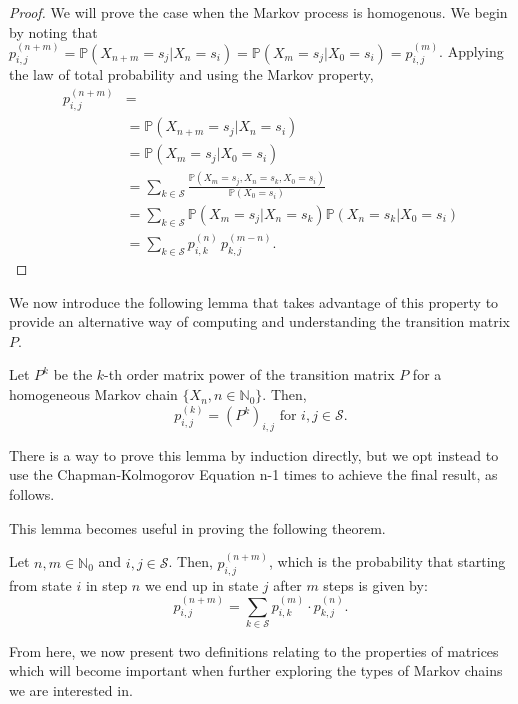 \begin{proof}
	We will prove the case when the Markov process is homogenous. We begin by noting that $p_{i,j}^{(n+m)} = \mathbb{P}(X_{n+m} = s_j | X_n = s_i) = \mathbb{P}(X_m = s_j | X_0 = s_i) = p_{i,j}^{(m)}$. Applying the law of total probability and using the Markov property, 
	\begin{align*} 
		p_{i,j}^{(n+m)} &= \\ 
		&= \mathbb{P}(X_{n+m} = s_j | X_n = s_i) \\
		&= \mathbb{P}(X_{m} = s_j | X_0 = s_i) \\
		&= \sum_{k \in \mathcal{S}} \frac{\mathbb{P}(X_m = s_j, X_{n} = s_k, X_0 = s_i)}{\mathbb{P}(X_0 = s_i)} \\
		&= \sum_{k \in \mathcal{S}} \mathbb{P}(X_m = s_j | X_n = s_k) \mathbb{P}(X_n = s_k | X_0 = s_i) \\
		&= \sum_{k \in \mathcal{S}} p_{i,k}^{(n)} \, p_{k,j}^{(m-n)}. 
	\end{align*}
\end{proof}

We now introduce the following lemma that takes advantage of this property to provide an alternative way of computing and understanding the transition matrix $P$. 

\begin{lemma}
	Let $P^k$ be the $k$-th order matrix power of the transition matrix $P$ for a homogeneous Markov chain $\{ X_n, n \in \mathbb{N}_0 \}$. Then, 
	\[ p_{i,j}^{(k)} = (P^k)_{i,j} \text{ for } i,j \in \mathcal{S}. \]
\end{lemma}

There is a way to prove this lemma by induction directly, but we opt instead to use the Chapman-Kolmogorov Equation n-1 times to achieve the final result, as follows. 

This lemma becomes useful in proving the following theorem. 

\begin{theorem}
	Let $n,m \in \mathbb{N}_0$ and $i,j \in \mathcal{S}$. Then, $p_{i,j}^{(n+m)}$, which is the probability that starting from state $i$ in step $n$ we end up in state $j$ after $m$ steps is given by: 
	\[ p_{i,j}^{(n+m)} = \sum_{k \in \mathcal{S}} p_{i,k}^{(m)} \cdot p_{k,j}^{(n)}. \]
\end{theorem}

From here, we now present two definitions relating to the properties of matrices which will become important when further exploring the types of Markov chains we are interested in. 

